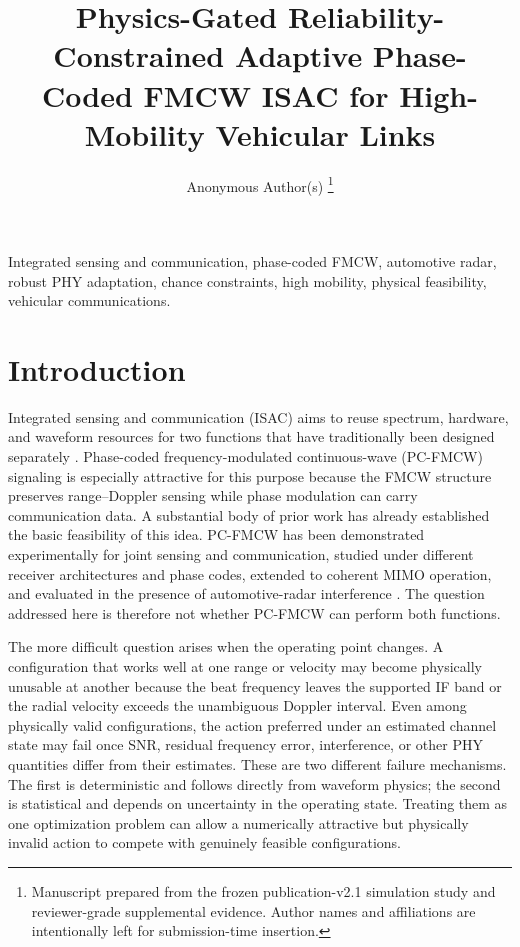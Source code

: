 \documentclass[journal]{IEEEtran}
\title{Physics-Gated Reliability-Constrained Adaptive Phase-Coded FMCW ISAC for High-Mobility Vehicular Links}
\author{Anonymous Author(s)%
\thanks{Manuscript prepared from the frozen publication-v2.1 simulation study and reviewer-grade supplemental evidence. Author names and affiliations are intentionally left for submission-time insertion.}}
\begin{document}
\maketitle



\begin{IEEEkeywords}
Integrated sensing and communication, phase-coded FMCW, automotive radar, robust PHY adaptation, chance constraints, high mobility, physical feasibility, vehicular communications.
\end{IEEEkeywords}

\section{Introduction}
\label{sec:introduction}

Integrated sensing and communication (ISAC) aims to reuse spectrum, hardware, and waveform resources for two functions that have traditionally been designed separately \cite{liu2022isac,wang2022isac}. Phase-coded frequency-modulated continuous-wave (PC-FMCW) signaling is especially attractive for this purpose because the FMCW structure preserves range--Doppler sensing while phase modulation can carry communication data. A substantial body of prior work has already established the basic feasibility of this idea. PC-FMCW has been demonstrated experimentally for joint sensing and communication, studied under different receiver architectures and phase codes, extended to coherent MIMO operation, and evaluated in the presence of automotive-radar interference \cite{kumbul2021experimental,kumbul2022receiver,kumbul2022smoothed,kumbul2022codes,kumbul2023mimo,kumbul2023performance,kumbul2024interference}. The question addressed here is therefore not whether PC-FMCW can perform both functions.

The more difficult question arises when the operating point changes. A configuration that works well at one range or velocity may become physically unusable at another because the beat frequency leaves the supported IF band or the radial velocity exceeds the unambiguous Doppler interval. Even among physically valid configurations, the action preferred under an estimated channel state may fail once SNR, residual frequency error, interference, or other PHY quantities differ from their estimates. These are two different failure mechanisms. The first is deterministic and follows directly from waveform physics; the second is statistical and depends on uncertainty in the operating state. Treating them as one optimization problem can allow a numerically attractive but physically invalid action to compete with genuinely feasible configurations.
\end{document}
